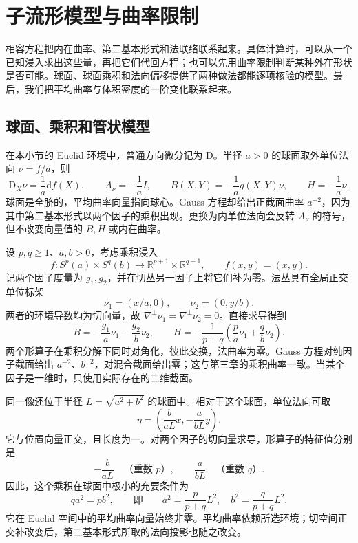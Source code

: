 
% 
% 
% 

\section{子流形模型与曲率限制}
\label{g3:sec:0404}

相容方程把内在曲率、第二基本形式和法联络联系起来。具体计算时，可以从一个已知浸入求出这些量，再把它们代回方程；也可以先用曲率限制判断某种外在形状是否可能。球面、球面乘积和法向偏移提供了两种做法都能逐项核验的模型。最后，我们把平均曲率与体积密度的一阶变化联系起来。

\subsection{球面、乘积和管状模型}
\label{g3:subsec:0404:01}

在本小节的 Euclid 环境中，普通方向微分记为 \(\mathrm D\)。半径 \(a>0\) 的球面取外单位法向 \(\nu=f/a\)，则
\[
	\mathrm D_X\nu=\frac1a\mathrm df(X),\qquad
	A_\nu=-\frac1a I,\qquad
	B(X,Y)=-\frac1a g(X,Y)\nu,
	\qquad H=-\frac1a\nu.
\]
球面是全脐的，平均曲率向量指向球心。Gauss 方程却给出正截面曲率 \(a^{-2}\)，因为其中第二基本形式以两个因子的乘积出现。更换为内单位法向会反转 \(A_\nu\) 的符号，但不改变向量值的 \(B,H\) 或内在曲率。

\begin{example}\label{g3:exm:product-spheres-normal-data}
	设 \(p,q\ge1\)、\(a,b>0\)，考虑乘积浸入
	\[
		f:S^p(a)\times S^q(b)\longrightarrow
		\mathbb R^{p+1}\times\mathbb R^{q+1},\qquad f(x,y)=(x,y).
	\]
	记两个因子度量为 \(g_1,g_2\)，并在切丛另一因子上将它们补为零。法丛具有全局正交单位标架
	\[
		\nu_1=(x/a,0),\qquad \nu_2=(0,y/b).
	\]
	两者的环境导数均为切向量，故 \(\nabla^\perp\nu_1=\nabla^\perp\nu_2=0\)。直接求导得到
	\[
		B=-\frac{g_1}{a}\nu_1-\frac{g_2}{b}\nu_2,
		\qquad
		H=-\frac1{p+q}\left(\frac pa\nu_1+\frac qb\nu_2\right).
	\]
	两个形算子在乘积分解下同时对角化，彼此交换，法曲率为零。Gauss 方程对纯因子截面给出 \(a^{-2}\)、\(b^{-2}\)，对混合截面给出零；这与第三章的乘积曲率一致。当某个因子是一维时，只使用实际存在的二维截面。

	同一像还位于半径 \(L=\sqrt{a^2+b^2}\) 的球面中。相对于这个球面，单位法向可取
	\[
		\eta=\left(\frac{b}{aL}x,-\frac{a}{bL}y\right).
	\]
	它与位置向量正交，且长度为一。对两个因子的切向量求导，形算子的特征值分别是
	\[
		-\frac{b}{aL}\quad\text{（重数 \(p\)）},\qquad
		\frac{a}{bL}\quad\text{（重数 \(q\)）}.
	\]
	因此，这个乘积在球面中极小的充要条件为
	\[
		q a^2=p b^2,
		\qquad\text{即}\qquad
		a^2=\frac{p}{p+q}L^2,\quad b^2=\frac{q}{p+q}L^2.
	\]
	它在 Euclid 空间中的平均曲率向量始终非零。平均曲率依赖所选环境；切空间正交补改变后，第二基本形式所取的法向投影也随之改变。
\end{example}

